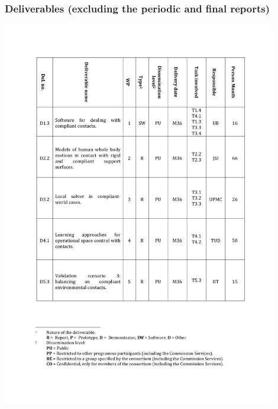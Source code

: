 \documentclass[12pt,a4paper,twoside]{article}
\begin{document}
\subsubsection{Deliverables (excluding the periodic and final reports)}
\centering
\includegraphics[width=0.9\textwidth]{./images/deliverables.pdf}
\end{document}
